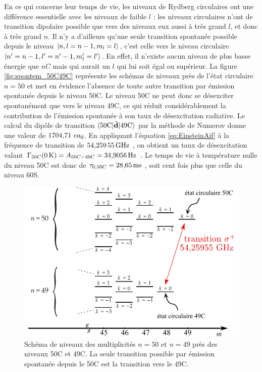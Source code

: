 En ce qui concerne leur temps de vie, les niveaux de Rydberg circulaires ont une différence essentielle avec les niveaux de faible $l$ : les niveaux circulaires n'ont de transition dipolaire possible que vers des niveaux eux aussi à très grand $l$, et donc à très grand $n$.
Il n'y a d'ailleurs qu'une seule transition spontanée possible depuis le niveau $\ket{n,l=n-1,m_l=l}$, c'est celle vers le niveau circulaire $\ket{n'=n-1,l'=n'-1,m_l'=l'}$.
En effet, il n'existe aucun niveau de plus basse énergie que $nC$ mais qui aurait un $l$ qui lui soit égal ou supérieur.
La figure \eqref{fig:spontem_50C49C} représente les schémas de niveaux près de l'état circulaire $n=50$ et met en évidence l'absence de toute autre transition par émission spontanée depuis le niveau 50C.
Le niveau 50C ne peut donc se désexciter spontanément que vers le niveau 49C, ce qui réduit considérablement la contribution de l'émission spontanée à son taux de désexcitation radiative.
Le calcul du dipôle de transition $\braket{50\text{C}|\hat{\mathbf{d}}|49\text{C}}$ par la méthode de Numerov donne une valeur de $\numv{1704.71} e a_0$.
En appliquant l'équation \eqref{eq:EinsteinAif} à la fréquence de transition de $\SIv{54.25955}{\giga\hertz}$, on obtient un taux de désexcitation valant $\Gamma_{50C}(\SIvv{0}{\kelvin}) = A_{50C-49C} = \SIv{34.9056}{\hertz}$.
Le temps de vie à température nulle du niveau 50C est donc de $\tau_{0,50C} = \SIv{28.65}{\ms}$, soit cent fois plus que celle du niveau 60S.
\begin{figure}
	\centering
	\includegraphics[width=0.7\linewidth]{figures/spontem_50C49C}
	\caption[Schéma de niveaux 50C-49C]{Schéma de niveaux des multiplicités $n=50$ et $n=49$ près des niveaux 50C et 49C. La seule transition possible par émission spontanée depuis le 50C est la transition vers le 49C.}
	\label{fig:spontem_50C49C}
\end{figure}


